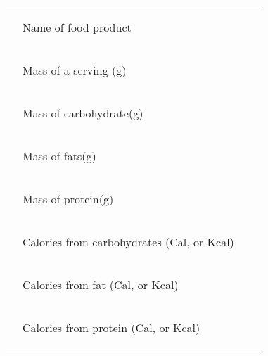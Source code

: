\documentclass[main.tex]{subfiles}
\begin{document}
\begin{center}\resizebox{18cm}{!} {\begin{tabular}{ p{2.0cm}p{7.5cm}p{3cm}p{5cm}  }
\hline
 &\begin{center}Name of food product \end{center}&&\begin{center}\rule{3.0cm}{0.4pt}\end{center}\\
    & \begin{center}Mass of a serving (g)\end{center}&&\begin{center}\rule{3.0cm}{0.4pt}\end{center}\\
      & \begin{center}Mass of carbohydrate(g)\end{center}&&\begin{center}\rule{3.0cm}{0.4pt}\end{center}\\
            & \begin{center}Mass of fats(g)\end{center}&&\begin{center}\rule{3.0cm}{0.4pt}\end{center}\\
                  & \begin{center}Mass of protein(g)\end{center}&&\begin{center}\rule{3.0cm}{0.4pt}\end{center}\\
            & \begin{center}Calories from carbohydrates (Cal, or Kcal)\end{center}&&\begin{center}\rule{3.0cm}{0.4pt}\end{center}\\
                        & \begin{center}Calories from fat (Cal, or Kcal)\end{center}&&\begin{center}\rule{3.0cm}{0.4pt}\end{center}\\
            & \begin{center}Calories from protein (Cal, or Kcal)\end{center}&&\begin{center}\rule{3.0cm}{0.4pt}\end{center}\\

\hline\end{tabular}}\end{center}
\end{document}
